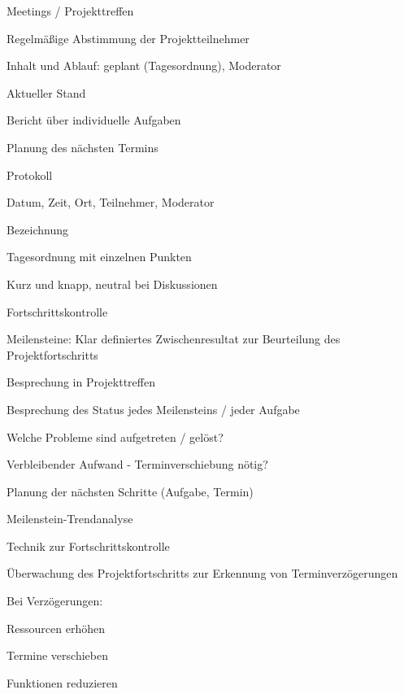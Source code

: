 \documentclass[a4paper]{article}
\begin{document}
\begin{multicols}{3}
  Meetings / Projekttreffen
  \begin{itemize*}
    \item Regelmäßige Abstimmung der Projektteilnehmer
    \item Inhalt und Ablauf: geplant (Tagesordnung), Moderator
    \begin{itemize*}
      \item Aktueller Stand
      \item Bericht über individuelle Aufgaben
      \item Planung des nächsten Termins
    \end{itemize*}
    \item Protokoll
    \begin{itemize*}
      \item Datum, Zeit, Ort, Teilnehmer, Moderator
      \item Bezeichnung
      \item Tagesordnung mit einzelnen Punkten
      \item Kurz und knapp, neutral bei Diskussionen
    \end{itemize*}
  \end{itemize*}

  Fortschrittskontrolle
  \begin{itemize*}
    \item Meilensteine: Klar definiertes Zwischenresultat zur Beurteilung des Projektfortschritts
    \item Besprechung in Projekttreffen
    \begin{itemize*}
      \item Besprechung des Status jedes Meilensteins / jeder Aufgabe
      \item Welche Probleme sind aufgetreten / gelöst?
      \item Verbleibender Aufwand - Terminverschiebung nötig?
      \item Planung der nächsten Schritte (Aufgabe, Termin)
    \end{itemize*}
  \end{itemize*}

  Meilenstein-Trendanalyse
  \begin{itemize*}
    \item Technik zur Fortschrittskontrolle
    \item Überwachung des Projektfortschritts zur Erkennung von Terminverzögerungen
    \item Bei Verzögerungen:
    \begin{itemize*}
      \item Ressourcen erhöhen
      \item Termine verschieben
      \item Funktionen reduzieren
    \end{itemize*}
  \end{itemize*}


\end{multicols}
\end{document}
